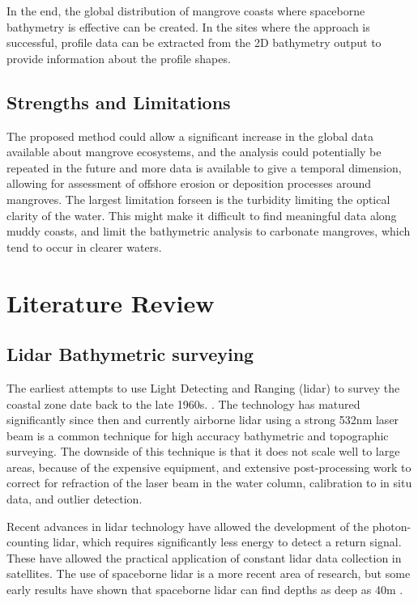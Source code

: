 In the end, the global distribution of mangrove coasts where spaceborne bathymetry is effective can be created. In the sites where the approach is successful, profile data can be extracted from the 2D bathymetry output to provide information about the profile shapes.


\section{Strengths and Limitations}

The proposed method could allow a significant increase in the global data available about mangrove ecosystems, and the analysis could potentially be repeated in the future and more data is available to give a temporal dimension, allowing for assessment of offshore erosion or deposition processes around mangroves. The largest limitation forseen is the turbidity limiting the optical clarity of the water. This might make it difficult to find meaningful data along muddy coasts, and limit the bathymetric analysis to carbonate mangroves, which tend to occur in clearer waters.


\chapter{Literature Review}

\section{Lidar Bathymetric surveying}

The earliest attempts to use Light Detecting and Ranging (lidar) to survey the coastal zone date back to the late 1960s. \parencite{Bailly2016}. The technology has matured significantly since then and currently airborne lidar using a strong 532nm laser beam is a common technique for high accuracy bathymetric and topographic surveying. The downside of this technique is that it does not scale well to large areas, because of the expensive equipment, and extensive post-processing work to correct for refraction of the laser beam in the water column, calibration to in situ data, and outlier detection.

Recent advances in lidar technology have allowed the development of the photon-counting lidar, which requires significantly less energy to detect a return signal. These have allowed the practical application of constant lidar data collection in satellites. The use of spaceborne lidar is a more recent area of research, but some early results have shown that spaceborne lidar can find depths as deep as 40m \parencite{Parrish2019}.

